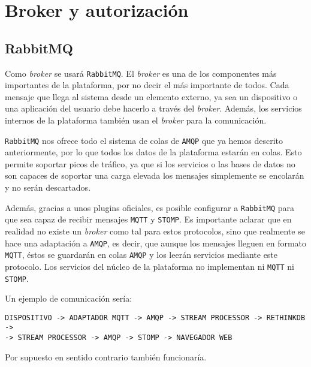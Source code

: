 \chapter{Broker y autorización}
\pagestyle{esitscCD}

\section{RabbitMQ}

Como \emph{broker} se usará \texttt{RabbitMQ}. El \emph{broker} es una de los
componentes más importantes de la plataforma, por no decir el más importante de
todos. Cada mensaje que llega al sistema desde un elemento externo, ya sea
un dispositivo o una aplicación del usuario debe hacerlo a través del \emph{broker}.
Además, los servicios internos de la plataforma también usan el \emph{broker} para
la comunicación.

\texttt{RabbitMQ} nos ofrece todo el sistema de colas de \texttt{AMQP} que ya
hemos descrito anteriormente, por lo que todos los datos de la plataforma
estarán en colas. Esto permite soportar picos de tráfico, ya que si los
servicios o las bases de datos no son capaces de soportar una carga elevada los
mensajes simplemente se encolarán y no serán descartados.

Además, gracias a unos plugins oficiales, es posible configurar a \texttt{RabbitMQ}
para que sea capaz de recibir mensajes \texttt{MQTT} y \texttt{STOMP}. Es importante
aclarar que en realidad no existe un \emph{broker} como tal para estos protocolos,
sino que realmente se hace una adaptación a \texttt{AMQP}, es decir, que aunque los
mensajes lleguen en formato \texttt{MQTT}, éstos se guardarán en colas \texttt{AMQP}
y los leerán servicios mediante este protocolo. Los servicios del núcleo de la
plataforma no implementan ni \texttt{MQTT} ni \texttt{STOMP}.

Un ejemplo de comunicación sería:

\begin{Verbatim}[frame=single]
DISPOSITIVO -> ADAPTADOR MQTT -> AMQP -> STREAM PROCESSOR -> RETHINKDB ->
-> STREAM PROCESSOR -> AMQP -> STOMP -> NAVEGADOR WEB
\end{Verbatim}

Por supuesto en sentido contrario también funcionaría.
